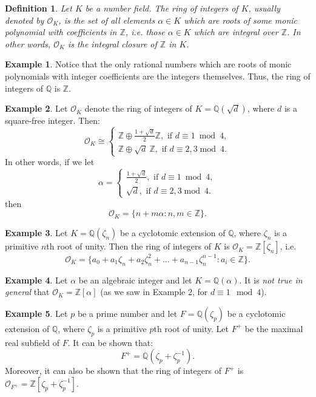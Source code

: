 \documentclass[12pt]{article}
\newtheorem{defn}{Definition}
\theoremstyle{definition}
\newtheorem{exa}{Example}
\newcommand{\Ints}{\mathbb{Z}}
\newcommand{\Rats}{\mathbb{Q}}
\begin{document}
\begin{defn}
Let $K$ be a number field. The ring of integers of $K$, usually denoted by $\mathcal{O}_K$, is the set of all elements $\alpha\in K$ which are roots of some monic polynomial with coefficients in $\Ints$, i.e. those $\alpha\in K$ which are integral over $\Ints$. In other words, $\mathcal{O}_K$ is the integral closure of $\Ints$ in $K$.
\end{defn}

\begin{exa}
Notice that the only rational numbers which are roots of monic polynomials with integer coefficients are the integers themselves. Thus, the ring of integers of $\Rats$ is $\Ints$.
\end{exa}

\begin{exa}
Let $\mathcal{O}_K$ denote the ring of integers of $K=\Rats(\sqrt{d})$, where $d$ is a square-free integer. Then:
$$\mathcal{O}_K\cong \begin{cases}
\Ints\oplus \frac{1+\sqrt{d}}{2}\Ints, \text{ if } d\equiv 1 \ \operatorname{mod}\ 4,\\
\Ints\oplus \sqrt{d}\ \Ints, \text{ if } d\equiv 2,3
\operatorname{mod}\ 4. \end{cases}
$$
In other words, if we let 
$$\alpha = \begin{cases}
\frac{1+\sqrt{d}}{2}, \text{ if } d\equiv 1 \ \operatorname{mod}\ 4,\\
\sqrt{d}, \text{ if } d\equiv 2,3
\operatorname{mod}\ 4. \end{cases}
$$
then
$$\mathcal{O}_K=\{ n+m\alpha : n,m \in \Ints \}.$$
\end{exa}

\begin{exa}
Let $K=\Rats(\zeta_n)$ be a cyclotomic extension of $\Rats$, where $\zeta_n$ is a primitive $n$th root of unity. Then the ring of integers of $K$ is $\mathcal{O}_K=\Ints[\zeta_n]$, i.e.
$$\mathcal{O}_K=\{ a_0 +a_1\zeta_n +a_2\zeta_n^2+\ldots+a_{n-1}\zeta_n^{n-1} : a_i \in \Ints\}.$$
\end{exa}

\begin{exa}
Let $\alpha$ be an algebraic integer and let $K=\Rats(\alpha)$. It is {\it not true in general} that $\mathcal{O}_K=\Ints[\alpha]$ (as we saw in Example $2$, for $d\equiv 1 \mod 4$).
\end{exa}

\begin{exa}
Let $p$ be a prime number and let $F=\Rats(\zeta_p)$ be a cyclotomic extension of $\Rats$, where $\zeta_p$ is a primitive $p$th root of unity. Let $F^+$ be the maximal real subfield of $F$. It can be shown that:
$$F^+=\Rats(\zeta_p+\zeta_p^{-1}).$$
Moreover, it can also be shown that the ring of integers of $F^+$ is $\mathcal{O}_{F^+}=\Ints[\zeta_p+\zeta_p^{-1}]$. 
\end{exa}
\end{document}
